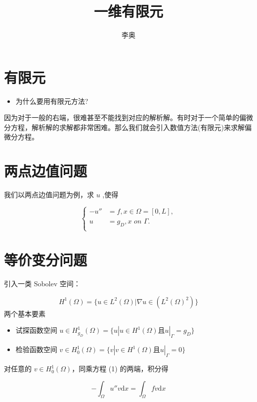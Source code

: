 \documentclass{article}
\begin{document}
\title{一维有限元}
\author{李奥}
\date{\chntoday}
\maketitle

\section{有限元}
\begin{itemize}
    \item 为什么要用有限元方法?
\end{itemize}
因为对于一般的右端，很难甚至不能找到对应的解析解。有时对于一个简单的偏微分方程，解析解的求解都非常困难。那么我们就会引入数值方法(有限元)来求解偏微分方程。

\section{两点边值问题}
我们以两点边值问题为例，求 $u$ ,使得

\begin{equation}
	\begin{cases}
		-u'' & = f, x \in \Omega = [0, L], \\
		u & = g_D,  x \,\, on \,\, \Gamma.\\
	\end{cases}
\end{equation}

\section{等价变分问题}

引入一类 Sobolev 空间：

\begin{equation*}
	H^1(\Omega) = \{u\in L^2(\Omega)|\nabla u \in (L^2(\Omega)^2)\}
\end{equation*}
两个基本要素

\begin{itemize}
	\item 试探函数空间 $u \in H^1_{g_D}(\Omega) = \{u|u \in H^1(\Omega) \text{且} u|_{\Gamma} = g_D\}$
    \item 检验函数空间 $v \in H^1_0(\Omega) = \{v|v \in H^1(\Omega) \text{且} u|_{\Gamma} = 0\}$
\end{itemize}

对任意的 $v \in H^1_0(\Omega)$，同乘方程 (1) 的两端，积分得

\begin{equation}
	-\int_{\Omega} u'' v \mathrm{d}x = \int_{\Omega} fv \mathrm{d}x
\end{equation}
\end{document}
